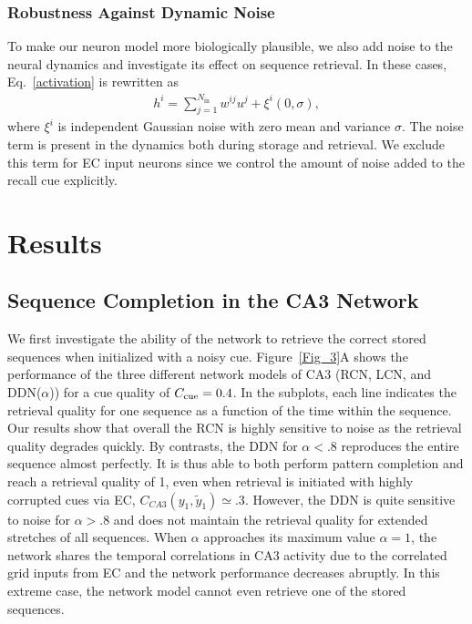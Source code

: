 \documentclass[utf8]{frontiersSCNS} %
\begin{document}
\subsubsection{Robustness Against Dynamic Noise}

To make our neuron model more biologically plausible, we also add noise to the neural dynamics and investigate its effect on sequence retrieval. In these cases, Eq.~\ref{activation} is rewritten as
\begin{align}
\label{dynamic-noise}
h^i = \sum_{j=1}^{N_\mathrm{in}} w^{ij}u^j + \xi ^i (0,\sigma),
\end{align}  
where $\xi^i$ is independent Gaussian noise with zero mean and variance $\sigma$. The noise term is present in the dynamics both during storage and retrieval. We exclude this term for EC input neurons since we control the amount of noise added to the recall cue explicitly.


\section{Results}
\subsection{Sequence Completion in the CA3 Network}

We first investigate the ability of the network to retrieve the correct stored sequences when initialized with a noisy cue. Figure~\ref{Fig_3}A shows the performance of the three different network models of CA3 (RCN, LCN, and DDN($\alpha$)) for a cue quality of $C_{\rm cue} = 0.4$. In the subplots, each line indicates the retrieval quality for one sequence as a function of the time within the sequence. Our results show that overall the RCN is highly sensitive to noise as the retrieval quality degrades quickly.  
By contrasts, the DDN for $\alpha < .8$ reproduces the entire sequence almost perfectly. It is thus able to both perform pattern completion and reach a retrieval quality of 1, even when retrieval is initiated with highly corrupted cues via EC, $C_{CA3} (y_1, \tilde{y}_1) \simeq .3 $. 
However, the DDN is quite sensitive to noise for $\alpha > .8$ and does not maintain the retrieval quality for extended stretches of all sequences. When $\alpha$ approaches its maximum value $\alpha = 1$, the network shares the temporal correlations in CA3 activity due to the correlated grid inputs from EC and the network performance decreases abruptly. In this extreme case, the network model cannot even retrieve one of the stored sequences.
% 
\end{document}
